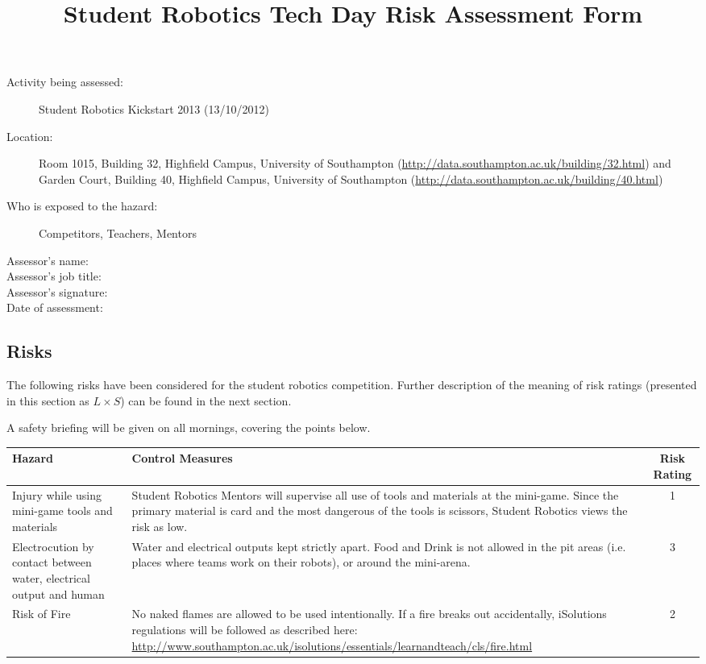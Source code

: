 \documentclass[12pt,a4paper]{scrartcl}
\title{Student Robotics Tech Day Risk Assessment Form}
\begin{document}
\maketitle

\begin{description}
\item[Activity being assessed:] Student Robotics Kickstart 2013 (13/10/2012)
\item[Location:] Room 1015, Building 32, Highfield Campus, University of Southampton (\url{http://data.southampton.ac.uk/building/32.html}) and Garden Court, Building 40, Highfield Campus, University of Southampton (\url{http://data.southampton.ac.uk/building/40.html})
\item[Who is exposed to the hazard:] Competitors, Teachers, Mentors
\end{description}

\begin{description}
\item[Assessor's name:]
\item[Assessor's job title:]
\item[Assessor's signature:]
\item[Date of assessment:]
\end{description}
\clearpage

\newcommand{\risk}[3]{
 #1 & #2 & #3 \\
}

\begin{landscape}
\section{Risks}
The following risks have been considered for the student robotics competition.  Further description of the meaning of risk ratings (presented in this section as $L \times S$) can be found in the next section.

A safety briefing will be given on all mornings, covering the points below.

\bigskip
\begin{tabular*}{\linewidth}[c]{p{14em}p{30em}c}
\toprule
\textbf{Hazard} & \textbf{Control Measures} & \textbf{Risk Rating} \\
\midrule

\risk{Injury while using mini-game tools and materials}
{Student Robotics Mentors will supervise all use of tools and materials at the mini-game. Since the primary material is card and the most dangerous of the tools is scissors, Student Robotics views the risk as low.}
{1}

\risk{Electrocution by contact between water, electrical output and human}
{Water and electrical outputs kept strictly apart. Food and Drink is not allowed in the pit areas (i.e. places where teams work on their robots), or around the mini-arena.}
{3}

\risk{Risk of Fire}
{No naked flames are allowed to be used intentionally. If a fire breaks out accidentally, iSolutions regulations will be followed as described here: \url{http://www.southampton.ac.uk/isolutions/essentials/learnandteach/cls/fire.html}}
{2}
\bottomrule
\end{tabular*}
\end{landscape}
\end{document}
